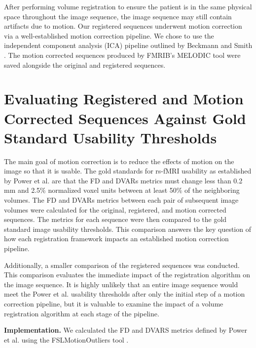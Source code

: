 After performing volume registration to ensure the patient is in the same physical space throughout the image sequence, the image sequence may still contain artifacts due to motion. Our registered sequences underwent motion correction via a well-established motion correction pipeline. We chose to use the independent component analysis (ICA) pipeline outlined by Beckmann and Smith \cite{Beckmann2004}. The motion corrected sequences produced by FMRIB's MELODIC tool were saved alongside the original and registered sequences.  

\section{Evaluating Registered and Motion Corrected Sequences Against Gold Standard Usability Thresholds}

The main goal of motion correction is to reduce the effects of motion on the image so that it is usable. The gold standards for rs-fMRI usability as established by Power et al. are that the FD and DVARs metrics must change less than 0.2 mm and 2.5\% normalized voxel units between at least 50\% of the neighboring volumes. The FD and DVARs metrics between each pair of subsequent image volumes were calculated for the original, registered, and motion corrected sequences. The metrics for each sequence were then compared to the gold standard image usability thresholds. This comparison answers the key question of how each registration framework impacts an established motion correction pipeline.

Additionally, a smaller comparison of the registered sequences was conducted. This comparison evaluates the immediate impact of the registration algorithm on the image sequence. It is highly unlikely that an entire image sequence would meet the Power et al. usability thresholds after only the initial step of a motion correction pipeline, but it is valuable to examine the impact of a volume registration algorithm at each stage of the pipeline. 

\textbf{Implementation.} We calculated the FD and DVARS metrics defined by Power et al. using the FSLMotionOutliers tool \cite{Power2012}. 

